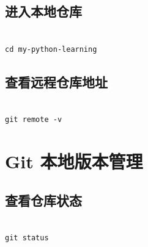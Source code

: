 


\subsection{进入本地仓库}



\begin{lstlisting}

cd my-python-learning

\end{lstlisting}



\subsection{查看远程仓库地址}



\begin{lstlisting}

git remote -v

\end{lstlisting}














\section{Git 本地版本管理}



\subsection{查看仓库状态}



\begin{lstlisting}

git status

\end{lstlisting}



